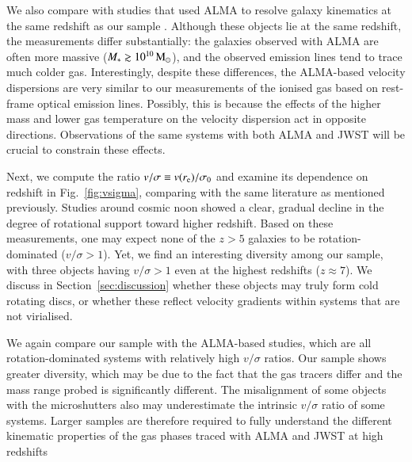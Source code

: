 \documentclass[longauth]{aa}
\newcommand{\Msun}{\rm M_\odot}
\newcommand{\re}{r_{\rm e}}
\newcommand{\vdisp}{\sigma_0}
\begin{document}
We also compare with studies that used ALMA to resolve galaxy kinematics at the same redshift as our sample \citep[blue triangles;][]{Neeleman2020,Rizzo2020,Fraternali2021,Lelli2021,Rizzo2021,Herrera2022,Parlanti2023}. Although these objects lie at the same redshift, the measurements differ substantially: the galaxies observed with ALMA are often more massive ($M_*\gtrsim10^{10}\,\Msun$), and the observed emission lines tend to trace much colder gas. Interestingly, despite these differences, the ALMA-based velocity dispersions are very similar to our measurements of the ionised gas based on rest-frame optical emission lines. Possibly, this is because the effects of the higher mass and lower gas temperature on the velocity dispersion act in opposite directions. Observations of the same systems with both ALMA and JWST will be crucial to constrain these effects.



Next, we compute the ratio $v/\sigma \equiv v(\re)/\vdisp$ and examine its dependence on redshift in Fig.~\ref{fig:vsigma}, comparing with the same literature as mentioned previously. Studies around cosmic noon showed a clear, gradual decline in the degree of rotational support toward higher redshift.
Based on these measurements, one may expect none of the $z>5$ galaxies to be rotation-dominated ($v/\sigma >1$). Yet, we find an interesting diversity among our sample, with three objects having $v/\sigma >1$ even at the highest redshifts ($z\approx7$). We discuss in Section~\ref{sec:discussion} whether these objects may truly form cold rotating discs, or whether these reflect velocity gradients within systems that are not virialised.

We again compare our sample with the ALMA-based studies, which are all rotation-dominated systems with relatively high $v/\sigma$ ratios. Our sample shows greater diversity, which may be due to the fact that the gas tracers differ and the mass range probed is significantly different. The misalignment of some objects with the microshutters also may underestimate the intrinsic $v/\sigma$ ratio of some systems. Larger samples are therefore required to fully understand the different kinematic properties of the gas phases traced with ALMA and JWST at high redshifts 
\end{document}
